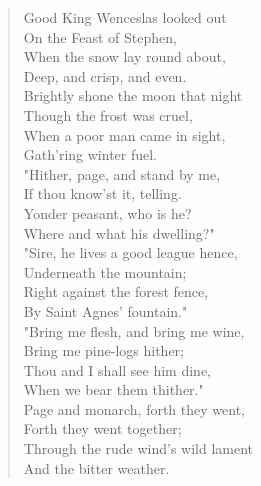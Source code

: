 
\begin{verse}
Good King Wenceslas looked out\\
\hspace*{2em}On the Feast of Stephen,\\
When the snow lay round about,\\
\hspace*{2em}Deep, and crisp, and even.\\[0.7em]

Brightly shone the moon that night\\
\hspace*{2em}Though the frost was cruel,\\
When a poor man came in sight,\\
\hspace*{2em}Gath'ring winter fuel.\\[0.7em]

"Hither, page, and stand by me,\\
\hspace*{2em}If thou know'st it, telling.\\
Yonder peasant, who is he?\\
\hspace*{2em}Where and what his dwelling?"\\[0.7em]

"Sire, he lives a good league hence,\\
\hspace*{2em}Underneath the mountain;\\
Right against the forest fence,\\
\hspace*{2em}By Saint Agnes' fountain."\\[0.7em]

"Bring me flesh, and bring me wine,\\
\hspace*{2em}Bring me pine-logs hither;\\
Thou and I shall see him dine,\\
\hspace*{2em}When we bear them thither."\\[0.7em]

Page and monarch, forth they went,\\
\hspace*{2em}Forth they went together;\\
Through the rude wind's wild lament\\
\hspace*{2em}And the bitter weather.\\[0.7em]


\end{verse}

